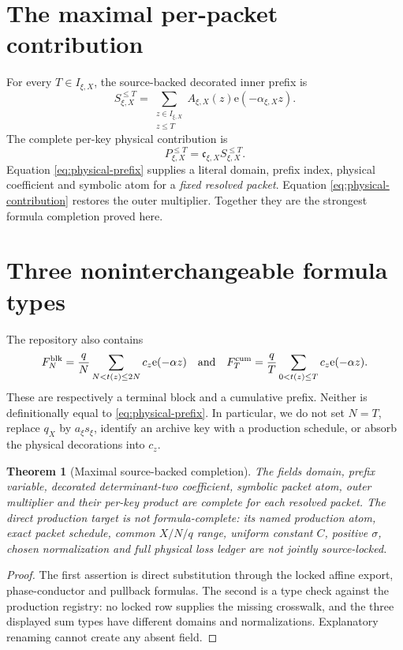 \documentclass[11pt]{article}
\newtheorem{theorem}{Theorem}
\newcommand{\e}{\mathrm{e}}
\begin{document}
\section{The maximal per-packet contribution}
For every \(T\in I_{\xi,X}\), the source-backed decorated inner prefix is
\begin{equation}\label{eq:physical-prefix}
 S_{\xi,X}^{\leq T}
 =\sum_{\substack{z\in I_{\xi,X}\\z\leq T}}
 A_{\xi,X}(z)\e(-\alpha_{\xi,X}z).
\end{equation}
The complete per-key physical contribution is
\begin{equation}\label{eq:physical-contribution}
 P_{\xi,X}^{\leq T}
 =\mathfrak c_{\xi,X}S_{\xi,X}^{\leq T}.
\end{equation}
Equation \eqref{eq:physical-prefix} supplies a literal domain, prefix index,
physical coefficient and symbolic atom for a \emph{fixed resolved packet}.
Equation \eqref{eq:physical-contribution} restores the outer multiplier.
Together they are the strongest formula completion proved here.

\section{Three noninterchangeable formula types}
The repository also contains
\[
 F_N^{\rm blk}=\frac{q}{N}\sum_{N<t(z)\leq2N}
 c_z \e(-\alpha z)
\quad\hbox{and}\quad
 F_T^{\rm cum}=\frac{q}{T}\sum_{0<t(z)\leq T}
 c_z \e(-\alpha z).
\]
These are respectively a terminal block and a cumulative prefix.
Neither is definitionally equal to \eqref{eq:physical-prefix}.  In
particular, we do not set \(N=T\), replace \(q_X\) by \(a_\xi s_\xi\),
identify an archive key with a production schedule, or absorb the physical
decorations into \(c_z\).

\begin{theorem}[Maximal source-backed completion]
The fields domain, prefix variable, decorated determinant-two coefficient,
symbolic packet atom, outer multiplier and their per-key product are complete
for each resolved packet.  The direct production target is not
formula-complete: its named
production atom, exact packet schedule, common \(X/N/q\) range, uniform
constant \(C\), positive \(\sigma\), chosen normalization and full physical
loss ledger are not jointly source-locked.
\end{theorem}
\begin{proof}
The first assertion is direct substitution through the locked affine export,
phase-conductor and pullback formulas.  The second is a type check against the
production registry: no locked row supplies the missing crosswalk, and the
three displayed sum types have different domains and normalizations.
Explanatory renaming cannot create any absent field.
\end{proof}
\end{document}

